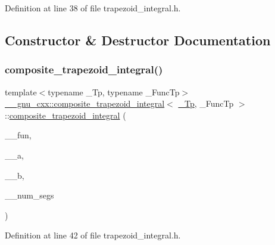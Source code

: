 Definition at line 38 of file trapezoid\+\_\+integral.\+h.



\subsection{Constructor \& Destructor Documentation}
\mbox{\label{class____gnu__cxx_1_1composite__trapezoid__integral_a168c2e7ecd8c89e87cc308e756c486ed}} 
\subsubsection{\texorpdfstring{composite\+\_\+trapezoid\+\_\+integral()}{composite\_trapezoid\_integral()}}
{\footnotesize\ttfamily template$<$typename \+\_\+\+Tp, typename \+\_\+\+Func\+Tp$>$ \\
\hyperlink{class____gnu__cxx_1_1composite__trapezoid__integral}{\+\_\+\+\_\+gnu\+\_\+cxx\+::composite\+\_\+trapezoid\+\_\+integral}$<$ \hyperlink{namespace____gnu__cxx_a3b19a9c800ca194374ef9172290f7d79}{\+\_\+\+Tp}, \+\_\+\+Func\+Tp $>$\+::\hyperlink{class____gnu__cxx_1_1composite__trapezoid__integral}{composite\+\_\+trapezoid\+\_\+integral} (\begin{DoxyParamCaption}\item[{\+\_\+\+Func\+Tp}]{\+\_\+\+\_\+fun,  }\item[{\hyperlink{namespace____gnu__cxx_a3b19a9c800ca194374ef9172290f7d79}{\+\_\+\+Tp}}]{\+\_\+\+\_\+a,  }\item[{\hyperlink{namespace____gnu__cxx_a3b19a9c800ca194374ef9172290f7d79}{\+\_\+\+Tp}}]{\+\_\+\+\_\+b,  }\item[{std\+::size\+\_\+t}]{\+\_\+\+\_\+num\+\_\+segs }\end{DoxyParamCaption})\hspace{0.3cm}{\ttfamily [inline]}}



Definition at line 42 of file trapezoid\+\_\+integral.\+h.




